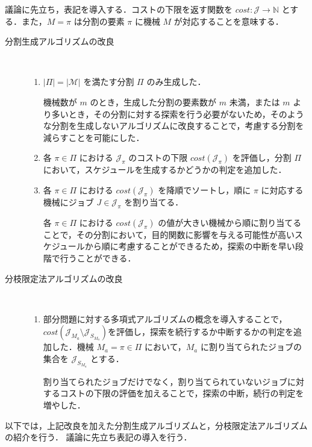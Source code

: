 \documentclass[12pt]{optlab-bachelor}
\begin{document}
議論に先立ち，表記を導入する．コストの下限を返す関数を $cost : \mathcal{J} \to \mathbb{N}$ とする．また，$M = \pi$ は分割の要素 $\pi$ に機械 $M$ が対応することを意味する．
\begin{description}
  \item[分割生成アルゴリズムの改良] ~
  \begin{enumerate}
    \setlength{\leftskip}{-10mm}
    \item $|\Pi| = |\mathcal{M}|$ を満たす分割 $\Pi$ のみ生成した．

    機械数が $m$ のとき，生成した分割の要素数が $m$ 未満，または $m$ より多いとき，その分割に対する探索を行う必要がないため，そのような分割を生成しないアルゴリズムに改良することで，考慮する分割を減らすことを可能にした．

    \item 各 $\pi \in \Pi$ における $\mathcal{J}_{\pi}$ のコストの下限 $cost(\mathcal{J}_{\pi})$ を評価し，分割 $\Pi$ において，スケジュールを生成するかどうかの判定を追加した．

    \item 各 $\pi \in \Pi$ における $cost(\mathcal{J}_{\pi})$ を降順でソートし，順に $\pi$ に対応する機械にジョブ $J \in \mathcal{J}_{\pi}$ を割り当てる．

    各 $\pi \in \Pi$ における $cost(\mathcal{J}_{\pi})$ の値が大きい機械から順に割り当てることで，その分割において，目的関数に影響を与える可能性が高いスケジュールから順に考慮することができるため，探索の中断を早い段階で行うことができる．

  \end{enumerate}
  \item[分枝限定法アルゴリズムの改良] ~
  \begin{enumerate}
    \setlength{\leftskip}{-10mm}
    \item 部分問題に対する多項式アルゴリズムの概念を導入することで，$cost(\mathcal{J}_{M_a} \setminus \mathcal{J}_{S_{M_a}})$を評価し，探索を続行するか中断するかの判定を追加した．機械 $M_a = \pi \in \Pi$ において，$M_a$ に割り当てられたジョブの集合を $\mathcal{J}_{S_{M_a}}$ とする．

    割り当てられたジョブだけでなく，割り当てられていないジョブに対するコストの下限の評価を加えることで，探索の中断，続行の判定を増やした．
  \end{enumerate}
\end{description}

以下では，上記改良を加えた分割生成アルゴリズムと，分枝限定法アルゴリズムの紹介を行う．
議論に先立ち表記の導入を行う．
\end{document}
